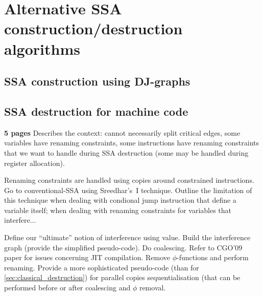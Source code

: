 \applynumberofpages\chapter{Alternative SSA construction/destruction algorithms }

\section{SSA construction using DJ-graphs }

\section{SSA destruction for machine code }
\label{sec:advanced_destruction}
\textbf{5 pages}
Describes the context: cannot necessarily split critical edges, some variables have renaming constraints, some instructions have renaming constraints that we want to handle during SSA destruction (some may be handled during register allocation). 

Renaming constraints are handled using copies around constrained instructions. Go to conventional-SSA using Sreedhar's~I technique. Outline the limitation of this technique when dealing with condional jump instruction that define a variable itself; when dealing with renaming constraints for variables that interfere...

Define our ``ultimate'' notion of interference using value. Build the interference graph (provide the simplified pseudo-code). Do coalescing. Refer to CGO'09 paper for issues concerning JIT compilation. Remove $\phi$-functions and perform renaming. Provide a more sophisticated pseudo-code (than for \ref{sec:classical_destruction}) for parallel copies sequentialisation (that can be performed before or after coalescing and $\phi$ removal.

